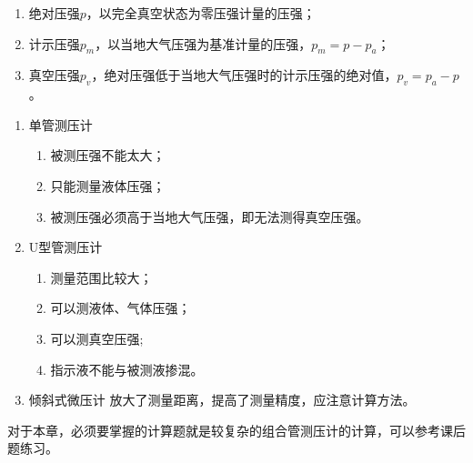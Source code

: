 
\begin{enumerate}
	\item 绝对压强$p$，以完全真空状态为零压强计量的压强；
	\item 计示压强$p_m$，以当地大气压强为基准计量的压强，$p_m = p - p_a$；
	\item 真空压强$p_v$，绝对压强低于当地大气压强时的计示压强的绝对值，$p_v = p_a - p$。
\end{enumerate}


\begin{enumerate}
	\item 单管测压计
	\begin{enumerate}
		\item 被测压强不能太大；
		\item 只能测量液体压强；
		\item 被测压强必须高于当地大气压强，即无法测得真空压强。
	\end{enumerate}
    \item U型管测压计
    \begin{enumerate}
    	\item 测量范围比较大；
    	\item 可以测液体、气体压强；
    	\item 可以测真空压强;
    	\item 指示液不能与被测液掺混。
    \end{enumerate}
    \item 倾斜式微压计
    放大了测量距离，提高了测量精度，应注意计算方法。
\end{enumerate}

\begin{tip}
	对于本章，必须要掌握的计算题就是较复杂的组合管测压计的计算，可以参考课后题练习。
\end{tip}